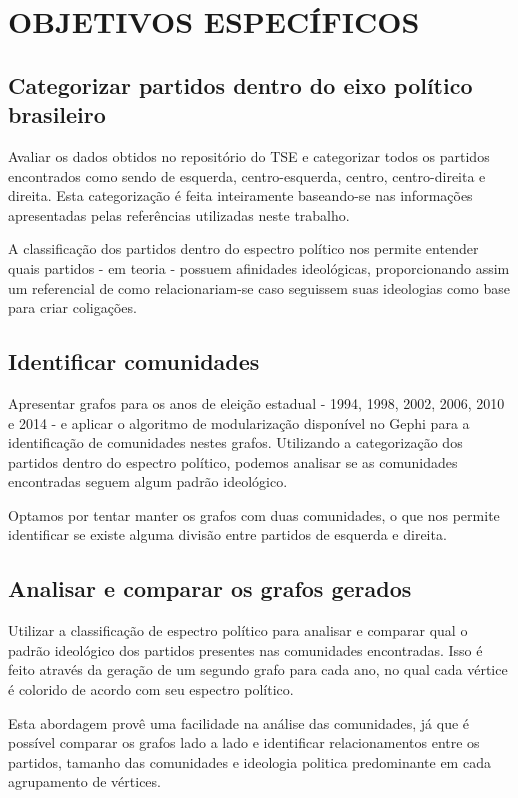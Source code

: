 \section{\texorpdfstring{\MakeUppercase{Objetivos Específicos}}{}}
\label{proposta__objetivos-especificos}

\subsection{Categorizar partidos dentro do eixo político brasileiro}
\label{proposta__objetivos-especificos--categorizacao}

Avaliar os dados obtidos no repositório do \gls{TSE} e categorizar todos os partidos encontrados como sendo de esquerda, centro-esquerda, centro, centro-direita e direita. Esta categorização é feita inteiramente baseando-se nas informações apresentadas pelas referências utilizadas neste trabalho.

A classificação dos partidos dentro do espectro político nos permite entender quais partidos - em teoria - possuem afinidades ideológicas, proporcionando assim um referencial de como relacionariam-se caso seguissem suas ideologias como base para criar coligações. 

\subsection{Identificar comunidades}
\label{proposta__objetivos-especificos--identificacao-comunidades}

Apresentar grafos para os anos de eleição estadual - 1994, 1998, 2002, 2006, 2010 e 2014 - e aplicar o algoritmo de modularização disponível no Gephi para a identificação de comunidades nestes grafos. Utilizando a categorização dos partidos dentro do espectro político, podemos analisar se as comunidades encontradas seguem algum padrão ideológico.

Optamos por tentar manter os grafos com duas comunidades, o que nos permite identificar se existe alguma divisão entre partidos de esquerda e direita.  

\subsection{Analisar e comparar os grafos gerados}
\label{proposta__objetivos-especificos--analise-comparacao}

Utilizar a classificação de espectro político para analisar e comparar qual o padrão ideológico dos partidos presentes nas comunidades encontradas. Isso é feito através da geração de um segundo grafo para cada ano, no qual cada vértice é colorido de acordo com seu espectro político. 

Esta abordagem provê uma facilidade na análise das comunidades, já que é possível comparar os grafos lado a lado e identificar relacionamentos entre os partidos, tamanho das comunidades e ideologia politica predominante em cada agrupamento de vértices.

 